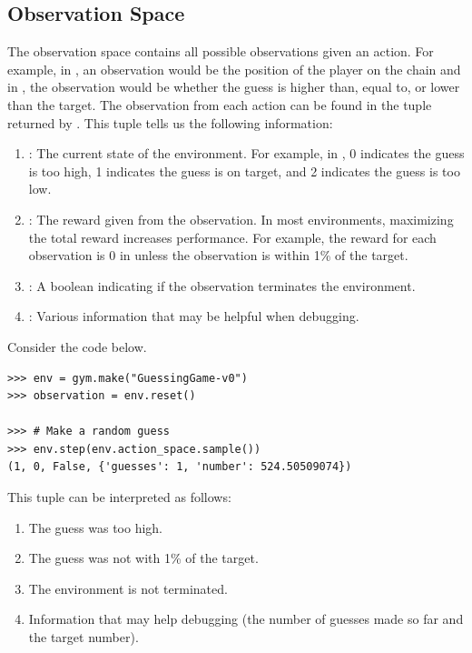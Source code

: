 \subsection*{Observation Space}

The observation space contains all possible observations given an action.
For example, in , an observation would be the position of the player on the chain and in , the observation would be whether the guess is higher than, equal to, or lower than the target.
The observation from each action can be found in the tuple returned by .
This tuple tells us the following information:
\begin{enumerate}
\item {}: The current state of the environment. For example, in , 0 indicates the guess is too high, 1 indicates the guess is on target, and 2 indicates the guess is too low.
\item {}: The reward given from the observation. In most environments, maximizing the total reward increases performance. For example, the reward for each observation is 0 in  unless the observation is within 1\% of the target.
\item {}: A boolean indicating if the observation terminates the environment.
\item {}: Various information that may be helpful when debugging.
\end{enumerate}
Consider the code below.

\begin{lstlisting}
>>> env = gym.make("GuessingGame-v0") 
>>> observation = env.reset()

>>> # Make a random guess
>>> env.step(env.action_space.sample())
(1, 0, False, {'guesses': 1, 'number': 524.50509074})
\end{lstlisting}
This tuple can be interpreted as follows:
\begin{enumerate}
\item The guess was too high.
\item The guess was not with 1\% of the target.
\item The environment is not terminated.
\item Information that may help debugging (the number of guesses made so far and the target number).
\end{enumerate}

